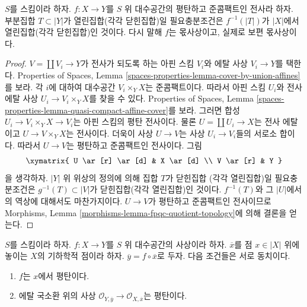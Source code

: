 \begin{lemma}
\label{lemma-fpqc-quotient-topology}
$S$를 스킴이라 하자.
$f : X \to Y$를 $S$ 위 대수공간의 평탄하고 준콤팩트인 전사라 하자.
부분집합 $T \subset |Y|$가 열린집합(각각 닫힌집합)일 필요충분조건은
$f^{-1}(|T|)$가 $|X|$에서 열린집합(각각 닫힌집합)인 것이다.
다시 말해 $f$는 몫사상이고, 실제로 보편 몫사상이다.
\end{lemma}

\begin{proof}
$V = \coprod V_i \to Y$가 전사가 되도록 하는 아핀 스킴 $V_i$와
에탈 사상 $V_i \to Y$를 택한다. Properties of Spaces, Lemma
\ref{spaces-properties-lemma-cover-by-union-affines}를 보라.
각 $i$에 대하여 대수공간 $V_i \times_Y X$는 준콤팩트이다.
따라서 아핀 스킴 $U_i$와 전사 에탈 사상
$U_i \to V_i \times_Y X$를 찾을 수 있다. Properties of Spaces, Lemma
\ref{spaces-properties-lemma-quasi-compact-affine-cover}를 보라.
그러면 합성 $U_i \to V_i \times_Y X \to V_i$는
아핀 스킴의 평탄 전사이다.
물론 $U = \coprod U_i \to X$는 전사 에탈이고
$U \to V \times_Y X$는 전사이다. 더욱이 사상 $U \to V$는
사상 $U_i \to V_i$들의 서로소 합이다. 따라서 $U \to V$는
평탄하고 준콤팩트인 전사이다. 그림
$$
\xymatrix{
U \ar[r] \ar[d] & X \ar[d] \\
V \ar[r] & Y
}
$$
을 생각하자. $|Y|$ 위 위상의 정의에 의해 집합 $T$가 닫힌집합
(각각 열린집합)일 필요충분조건은
$g^{-1}(T) \subset |V|$가 닫힌집합(각각 열린집합)인 것이다.
$f^{-1}(T)$와 그 $|U|$에서의 역상에 대해서도 마찬가지이다.
$U \to V$가 평탄하고 준콤팩트인 전사이므로 Morphisms, Lemma
\ref{morphisms-lemma-fpqc-quotient-topology}에 의해 결론을 얻는다.
\end{proof}

\begin{lemma}
\label{lemma-flat-at-point-etale-local-rings}
$S$를 스킴이라 하자.
$f : X \to Y$를 $S$ 위 대수공간의 사상이라 하자.
$\overline{x}$를 점 $x \in |X|$ 위에 놓이는 $X$의 기하학적 점이라 하자.
$\overline{y} = f \circ \overline{x}$로 두자. 다음 조건들은 서로 동치이다.
\begin{enumerate}
\item $f$는 $x$에서 평탄이다.
\item 에탈 국소환 위의 사상
$\mathcal{O}_{Y, \overline{y}} \to \mathcal{O}_{X, \overline{x}}$는
평탄이다.
\end{enumerate}
\end{lemma}

